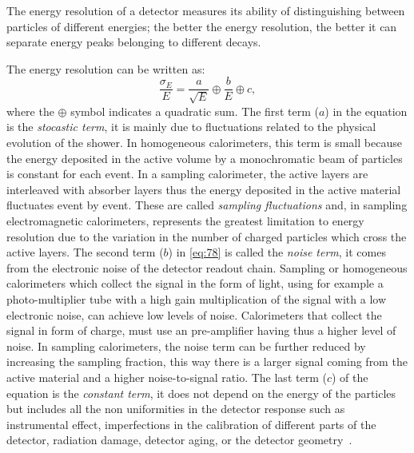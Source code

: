 The energy resolution of a detector measures its ability of distinguishing
between particles of different energies; the better the energy resolution, the
better it can separate energy peaks belonging to different decays.

The energy resolution can be written as:
\begin{equation}
  \label{eq:78}
  \frac{\sigma_E}{E} = \frac{a}{\sqrt{E}} \oplus \frac{b}{E} \oplus c,
\end{equation}
where the $\oplus$ symbol indicates a quadratic sum. The first term ($a$) in the
equation is the \emph{stocastic term}, it is mainly due to fluctuations related
to the physical evolution of the shower. In homogeneous calorimeters, this term
is small because the energy deposited in the active volume by a monochromatic
beam of particles is constant for each event. In a sampling calorimeter, the
active layers are interleaved with absorber layers thus the energy deposited in
the active material fluctuates event by event. These are called \emph{sampling
  fluctuations} and, in sampling electromagnetic calorimeters, represents the
greatest limitation to energy resolution due to the variation in the number of
charged particles which cross the active layers. The second term ($b$) in
\cref{eq:78} is called the \emph{noise term}, it comes from the electronic noise
of the detector readout chain. Sampling or homogeneous calorimeters which
collect the signal in the form of light, using for example a photo-multiplier
tube with a high gain multiplication of the signal with a low electronic noise,
can achieve low levels of noise. Calorimeters that collect the signal in form of
charge, must use an pre-amplifier having thus a higher level of noise. In
sampling calorimeters, the noise term can be further reduced by increasing the
sampling fraction, this way there is a larger signal coming from the active
material and a higher noise-to-signal ratio. The last term ($c$) of the
equation is the \emph{constant term}, it does not depend on the energy of the
particles but includes all the non uniformities in the detector response such as
instrumental effect, imperfections in the calibration of different parts of the
detector, radiation damage, detector aging, or the detector
geometry~\cite{Calorimetry}.
